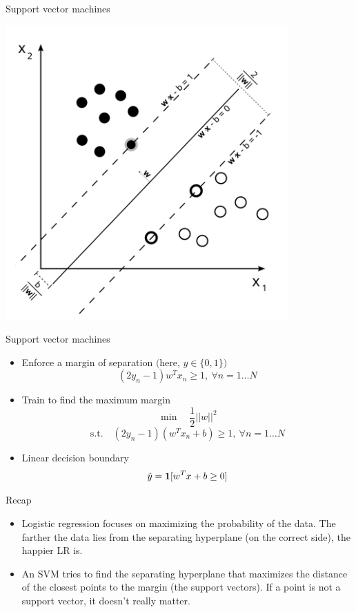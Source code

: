 \documentclass[12pt,notes,mathserif]{beamer}
\providecommand{\tightlist}{%
	\setlength{\itemsep}{0pt}\setlength{\parskip}{0pt}}
\begin{document}
\begin{frame}{Support vector machines}

\begin{center}
\includegraphics[width=.7\textwidth]{2018-04-15-19-55-03.png}
\end{center}

\end{frame}

\begin{frame}{Support vector machines}

\begin{itemize}
\tightlist
\item
  Enforce a margin of separation \((\)here, \(y\in\{0,1\})\) \[
  (2y_{n}-1)w^{T}x_{n}\geq 1,\ \forall n=1\ldots N
  \]
\item
  Train to find the maximum margin \[
  \min\quad \frac{1}{2}||w||^{2}
  \] \[
  \textrm{s.t.}\quad (2y_{n}-1)(w^{T}x_{n}+b)\geq 1,\ \forall n=1\ldots N
  \]
\item
  Linear decision boundary \[
  \hat{y}=\mathbf{1}[w^{T}x+b\geq 0]   
  \]
\end{itemize}

\end{frame}

\begin{frame}{Recap}

\begin{itemize}
\item
  Logistic regression focuses on maximizing the probability of the data.
  The farther the data lies from the separating hyperplane (on the
  correct side), the happier LR is.
\item
  An SVM tries to find the separating hyperplane that maximizes the
  distance of the closest points to the margin (the support vectors). If
  a point is not a support vector, it doesn't really matter.
\end{itemize}

\end{frame}
\end{document}
